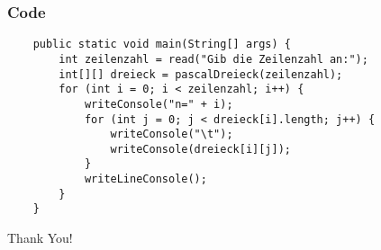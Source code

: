 \documentclass[handout, navsym]{tum-presentation}
\numberwithin{equation}{section}
\begin{document}
\begin{frame}[fragile]
\frametitle{Code}
\vspace*{\fill}
\center
\begin{lstlisting}
    public static void main(String[] args) {
        int zeilenzahl = read("Gib die Zeilenzahl an:");
        int[][] dreieck = pascalDreieck(zeilenzahl);
        for (int i = 0; i < zeilenzahl; i++) {
            writeConsole("n=" + i);
            for (int j = 0; j < dreieck[i].length; j++) {
                writeConsole("\t");
                writeConsole(dreieck[i][j]);
            }
            writeLineConsole();
        }
    }

\end{lstlisting}
\vspace*{\fill}
\end{frame}
\begin{frame}[fragile]
\vspace*{\fill} 
\begin{center}
 \Huge Thank You!
\end{center}
\vspace*{\fill} 
\end{frame}
\end{document}
